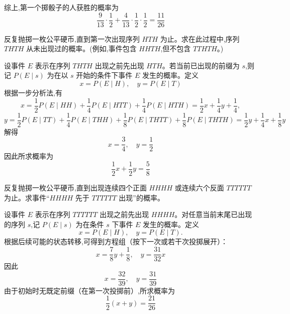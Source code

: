\begin{questions}
\begin{solution}
        综上,第一个掷骰子的人获胜的概率为
        \[
        \frac{9}{13}\cdot \frac{1}{2}+\frac{4}{13}\cdot \frac{1}{2}\cdot \frac{1}{2}=\frac{11}{26}
        \]
    \end{solution}

    \question 反复抛掷一枚公平硬币,直到第一次出现序列 $HTH$ 为止。求在此过程中,序列 $THTH$ 从未出现过的概率。(例如,事件包含 $HHTH$,但不包含 $TTHTH$。)
    \begin{solution}
        设事件 $E$ 表示在序列 $THTH$ 出现之前先出现 $HTH$。若当前已出现的前缀为 $s$,则记 $P(E\mid s)$ 为在以 $s$ 开始的条件下事件 $E$ 发生的概率。定义
        \[
        x = P(E\mid H), \quad y = P(E\mid T)
        \]
        根据一步分析法,有
        \[
        x = \frac{1}{2} P(E\mid HH) + \frac{1}{4} P(E\mid HTT) + \frac{1}{4} P(E\mid HTH) = \frac{1}{2}x + \frac{1}{4}y + \frac{1}{4},
        \]
        \[
        y = \frac{1}{2} P(E\mid TT) + \frac{1}{4} P(E\mid THH) + \frac{1}{8} P(E\mid THTT) + \frac{1}{8} P(E\mid THTH) = \frac{1}{2}y + \frac{1}{4}x + \frac{1}{8}y
        \]
        解得
        \[
        x = \frac{3}{4}, \quad y = \frac{1}{2}
        \]
        因此所求概率为
        \[
        \frac{1}{2}x + \frac{1}{2}y = \frac{5}{8}
        \]
    \end{solution}

    \question 反复抛掷一枚公平硬币,直到出现连续四个正面 $HHHH$ 或连续六个反面 $TTTTTT$ 为止。求事件“$HHHH$ 先于 $TTTTTT$ 出现”的概率。
    \begin{solution}
        设事件 $E$ 表示在序列 $TTTTTT$ 出现之前先出现 $HHHH$。对任意当前末尾已出现的序列 $s$,记 $P(E\mid s)$ 为在条件 $s$ 下事件 $E$ 发生的概率。定义
        \[
        x = P(E\mid H),\quad y = P(E\mid T).
        \]
        根据后续可能的状态转移,可得到方程组（按下一次或若干次投掷展开）：
        \[
        x = \frac{7}{8}y + \frac{1}{8}, \quad
        y = \frac{31}{32}x
        \]
        因此
        \[
        x = \frac{32}{39}, \quad y = \frac{31}{39}
        \]
        由于初始时无既定前缀（在第一次投掷前）,所求概率为 
        \[
        \frac12(x+y)= \frac{21}{26}
        \]
    \end{solution}


\end{questions}
